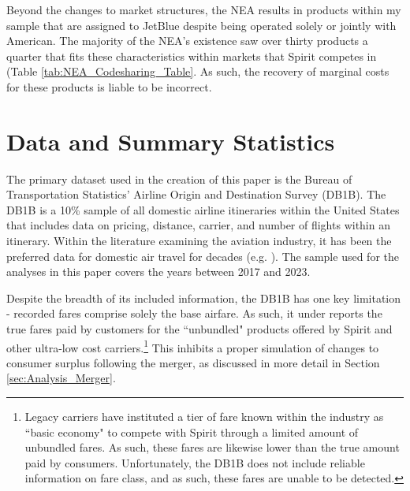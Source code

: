 \documentclass{article}
\begin{document}
    Beyond the changes to market structures, the NEA results in products within my sample that are assigned to JetBlue despite being operated solely or jointly with American. The majority of the NEA's existence saw over thirty products a quarter that fits these characteristics within markets that Spirit competes in (Table \ref{tab:NEA_Codesharing_Table}. As such, the recovery of marginal costs for these products is liable to be incorrect.  

	\section{Data and Summary Statistics}
	\label{sec:Data}
	The primary dataset used in the creation of this paper is the Bureau of Transportation Statistics' Airline Origin and Destination Survey (DB1B). The DB1B is a 10\% sample of all domestic airline itineraries within the United States that includes data on pricing, distance, carrier, and number of flights within an itinerary. Within the literature examining the aviation industry, it has been the preferred data for domestic air travel for decades (e.g. \citet{ciliberto_market_2021, berry_tracing_2010, goolsbee_how_2008, peters_evaluating_2006}). The sample used for the analyses in this paper covers the years between 2017 and 2023.  

    Despite the breadth of its included information, the DB1B has one key limitation - recorded fares comprise solely the base airfare. As such, it under reports the true fares paid by customers for the ``unbundled" products offered by Spirit and other ultra-low cost carriers.\footnote{Legacy carriers have instituted a tier of fare known within the industry as ``basic economy" to compete with Spirit through a limited amount of unbundled fares. As such, these fares are likewise lower than the true amount paid by consumers. Unfortunately, the DB1B does not include reliable information on fare class, and as such, these fares are unable to be detected.} This inhibits a proper simulation of changes to consumer surplus following the merger, as discussed in more detail in Section \ref{sec:Analysis_Merger}. 
    	
\end{document}
